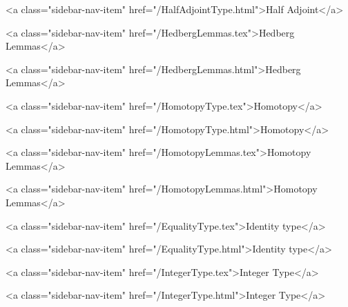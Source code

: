           <a class="sidebar-nav-item" href="/HalfAdjointType.html">Half Adjoint</a>
        
      
    
      
        
          <a class="sidebar-nav-item" href="/HedbergLemmas.tex">Hedberg Lemmas</a>
        
      
    
      
        
          <a class="sidebar-nav-item" href="/HedbergLemmas.html">Hedberg Lemmas</a>
        
      
    
      
        
          <a class="sidebar-nav-item" href="/HomotopyType.tex">Homotopy</a>
        
      
    
      
        
          <a class="sidebar-nav-item" href="/HomotopyType.html">Homotopy</a>
        
      
    
      
        
          <a class="sidebar-nav-item" href="/HomotopyLemmas.tex">Homotopy Lemmas</a>
        
      
    
      
        
          <a class="sidebar-nav-item" href="/HomotopyLemmas.html">Homotopy Lemmas</a>
        
      
    
      
        
          <a class="sidebar-nav-item" href="/EqualityType.tex">Identity type</a>
        
      
    
      
        
          <a class="sidebar-nav-item" href="/EqualityType.html">Identity type</a>
        
      
    
      
        
          <a class="sidebar-nav-item" href="/IntegerType.tex">Integer Type</a>
        
      
    
      
        
          <a class="sidebar-nav-item" href="/IntegerType.html">Integer Type</a>
        
      
    
      
        
